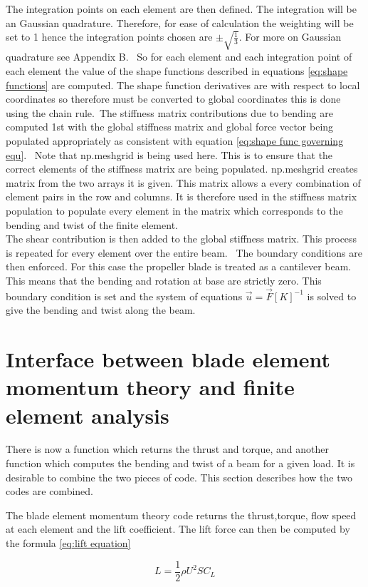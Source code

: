 \documentclass[]{report}
\begin{document}
The integration points on each element are then defined. The integration will be an Gaussian quadrature. Therefore, for ease of calculation the weighting will be set to 1 hence the integration points chosen are $\pm \sqrt{\frac{1}{3}}$. For more on Gaussian quadrature see Appendix B.
\
So for each element and each integration point of each element the value of the shape functions described in equations \ref{eq:shape functions} are computed. The shape function derivatives are with respect to local coordinates so therefore must be converted to global coordinates this is done using the chain rule.\
The stiffness matrix contributions due to bending are computed 1st with the global stiffness matrix and global force vector being populated appropriately as consistent with equation \ref{eq:shape func governing equ}. \
Note that np.meshgrid is being used here. This is to ensure that the correct elements of the stiffness matrix are being populated. np.meshgrid creates matrix from the two arrays it is given. This matrix allows a every combination of element pairs in the row and columns. It is therefore used in the stiffness matrix population to populate every element in the matrix which corresponds to the bending and twist of the finite element.
\\
The shear contribution is then added to the global stiffness matrix. This process is repeated for every element over the entire beam.
\ The boundary conditions are then enforced. For this case the propeller blade is treated as a cantilever beam. This means that the bending and rotation at base are strictly zero. This boundary condition is set and the system of equations $\vec{u} = \vec{F}[K]^{-1}$ is solved to give the bending and twist along the beam.

\section{Interface between blade element momentum theory and finite element analysis}
There is now a function which returns the thrust and torque, and another function which computes the bending and twist of a beam for a given load. It is desirable to combine the two pieces of code. This section describes how the two codes are combined.

The blade element momentum theory code returns the thrust,torque, flow speed at each element and the lift coefficient. The lift force can then be computed by the formula \ref{eq:lift equation}

\begin{equation}
 L = \frac{1}{2} \rho U^2 S C_L
 \label{eq:lift equation}
\end{equation} 
\end{document}
